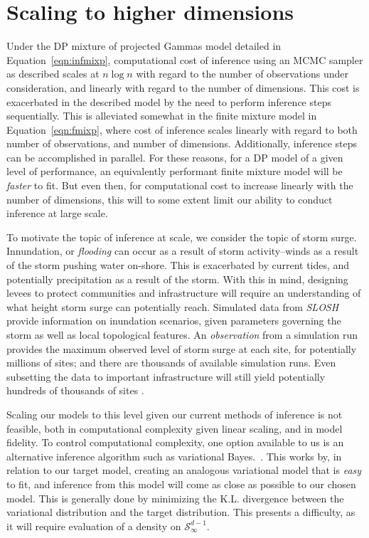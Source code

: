 \section{Scaling to higher dimensions}
Under the DP mixture of projected Gammas model detailed in Equation~\ref{eqn:infmixp}, computational
  cost of inference using an MCMC sampler as described scales at $n\log n$ with regard to the number
  of observations under consideration, and linearly with regard to the number of dimensions.  This cost
  is exacerbated in the described model by the need to perform inference steps sequentially.  This is
  alleviated somewhat in the finite mixture model in Equation~\ref{eqn:fmixp}, where cost of inference scales
  linearly with regard to both number of observations, and number of dimensions.  Additionally, inference
  steps can be accomplished in parallel.  For these reasons, for a DP model of a given level of performance,
  an equivalently performant finite mixture model will be \emph{faster} to fit.  But even then, for
  computational cost to increase linearly with the number of dimensions, this will to some extent limit
  our ability to conduct inference at large scale.

To motivate the topic of inference at scale, we consider the topic of storm surge.  Innundation, or
  \emph{flooding} can occur as a result of storm activity--winds as a result of the storm pushing water
  on-shore.  This is exacerbated by current tides, and potentially precipitation as a result of the storm.
  With this in mind, designing levees to protect communities and infrastructure will require an
  understanding of what height storm surge can potentially reach.  Simulated data from
  \emph{SLOSH}~\citep{jelesnianski1992} provide information on inundation scenarios, given parameters
  governing the storm as well as local topological features.  An \emph{observation} from a simulation
  run provides the maximum observed level of storm surge at each site, for potentially millions of sites;
  and there are thousands of available simulation runs.  Even subsetting the data to important
  infrastructure will still yield potentially hundreds of thousands of sites \citep{hutchings2021}.

Scaling our models to this level given our current methods of inference is not feasible, both in
  computational complexity given linear scaling, and in model fidelity.   To control computational
  complexity, one option available to us is an alternative inference algorithm such as variational
  Bayes.~\cite{green2015}.  This works by, in relation to our target model, creating an analogous
  variational model that is \emph{easy} to fit, and inference from this model will come as close as
  possible to our chosen model.  This is generally done by minimizing the K.L. divergence between
  the variational distribution and the target distribution.  This presents a difficulty, as it will
  require evaluation of a density on $\mathcal{S}_{\infty}^{d-1}$.

